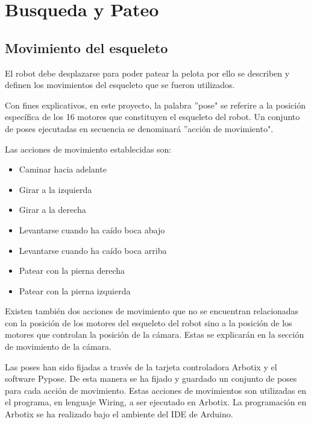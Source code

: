 \label{chapter:busqueda}
\section{Busqueda y Pateo}


\subsection{Movimiento del esqueleto}

El robot debe desplazarse para poder patear la pelota por ello se describen y definen los movimientos del esqueleto que se fueron utilizados.

Con fines explicativos, en este proyecto, la palabra ''pose" se referire a la posición específica de los 16 motores que constituyen el esqueleto del robot. Un conjunto de poses ejecutadas en secuencia se denominará ''acción de movimiento".


Las acciones de movimiento establecidas son:


\begin{itemize}
 \item {Caminar hacia adelante}
 \item {Girar a la izquierda}
 \item {Girar a la derecha}
 \item {Levantarse cuando ha caído boca abajo}
 \item {Levantarse cuando ha caído boca arriba}
 \item {Patear con la pierna derecha }
 \item {Patear con la pierna izquierda}
 
\end{itemize}

Existen también dos acciones de movimiento que no se encuentran relacionadas con la posición de los motores del esqueleto del robot sino a la posición de los motores que controlan la posición de la cámara. Estas se explicarán en la sección de movimiento de la cámara.

Las poses han sido fijadas a través de la tarjeta controladora Arbotix y el software Pypose. De esta manera se ha fijado y guardado un conjunto de poses para cada acción de movimiento. Estas acciones de movimientos son utilizadas en el programa, en lenguaje Wiring, a ser ejecutado en Arbotix. La programación en Arbotix se ha realizado bajo el ambiente del IDE de Arduino. 


